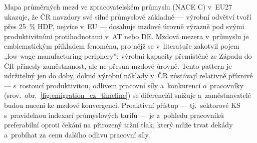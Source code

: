 Mapa průměrných mezd ve zpracovatelském průmyslu (\ac{NACE} C) v~EU27 ukazuje, že ČR navzdory své silné průmyslové základně --- výrobní odvětví tvoří přes \SI{25}{\percent} \ac{HDP}, nejvíce v~\ac{EU} --- dosahuje mzdové úrovně výrazně pod svými produktivitními protihodnotami v~AT nebo DE.
Mzdová mezera v~průmyslu je emblematickým příkladem fenoménu, pro nějž se v~literatuře zakotvil pojem „low-wage manufacturing periphery”: výrobní kapacity přemístěné ze Západu do ČR přinesly zaměstnanost, ale ne přesun mzdové úrovně.
Tento pattern je udržitelný jen do doby, dokud výrobní náklady v~ČR zůstávají relativně příznivé --- s~rostoucí produktivitou, odlivem pracovní síly a~konkurencí o~pracovníky (srov.~obr.~\ref{fig:emigration_cz_timeline}) se diferenciál snižuje a~zaměstnavatelé budou nuceni ke mzdové konvergenci.
Proaktivní přístup --- tj.~sektorové \ac{KS} s~pravidelnou indexací průmyslových tarifů --- je z~pohledu pracovníků preferabilní oproti čekání na přirozený tržní tlak, který může trvat dekády a~probíhat za cenu dalšího odlivu pracovní síly.


